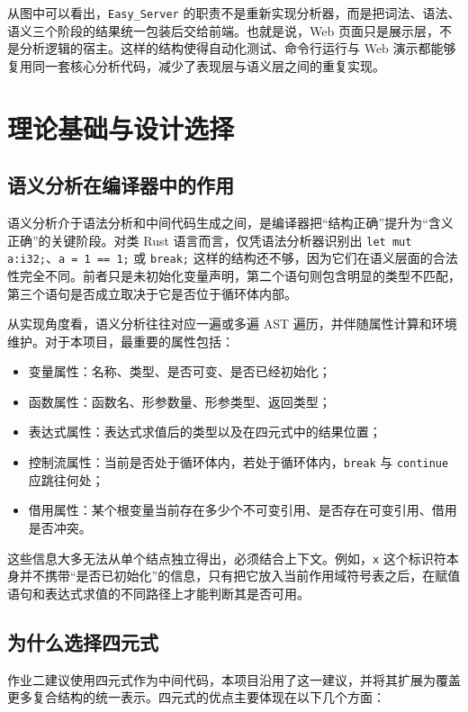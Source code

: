 \documentclass[UTF8,a4paper,12pt]{ctexart}
\newcommand{\pkg}[1]{\texttt{#1}}
\begin{document}
从图中可以看出，\pkg{Easy\_Server} 的职责不是重新实现分析器，而是把词法、语法、语义三个阶段的结果统一包装后交给前端。也就是说，Web 页面只是展示层，不是分析逻辑的宿主。这样的结构使得自动化测试、命令行运行与 Web 演示都能够复用同一套核心分析代码，减少了表现层与语义层之间的重复实现。

\section{理论基础与设计选择}

\subsection{语义分析在编译器中的作用}

语义分析介于语法分析和中间代码生成之间，是编译器把“结构正确”提升为“含义正确”的关键阶段。对类 Rust 语言而言，仅凭语法分析器识别出 \pkg{let mut a:i32;}、\pkg{a = 1 == 1;} 或 \pkg{break;} 这样的结构还不够，因为它们在语义层面的合法性完全不同。前者只是未初始化变量声明，第二个语句则包含明显的类型不匹配，第三个语句是否成立取决于它是否位于循环体内部。

从实现角度看，语义分析往往对应一遍或多遍 AST 遍历，并伴随属性计算和环境维护。对于本项目，最重要的属性包括：

\begin{itemize}
    \item 变量属性：名称、类型、是否可变、是否已经初始化；
    \item 函数属性：函数名、形参数量、形参类型、返回类型；
    \item 表达式属性：表达式求值后的类型以及在四元式中的结果位置；
    \item 控制流属性：当前是否处于循环体内，若处于循环体内，\pkg{break} 与 \pkg{continue} 应跳往何处；
    \item 借用属性：某个根变量当前存在多少个不可变引用、是否存在可变引用、借用是否冲突。
\end{itemize}

这些信息大多无法从单个结点独立得出，必须结合上下文。例如，\pkg{x} 这个标识符本身并不携带“是否已初始化”的信息，只有把它放入当前作用域符号表之后，在赋值语句和表达式求值的不同路径上才能判断其是否可用。

\subsection{为什么选择四元式}

作业二建议使用四元式作为中间代码，本项目沿用了这一建议，并将其扩展为覆盖更多复合结构的统一表示。四元式的优点主要体现在以下几个方面：
\end{document}
